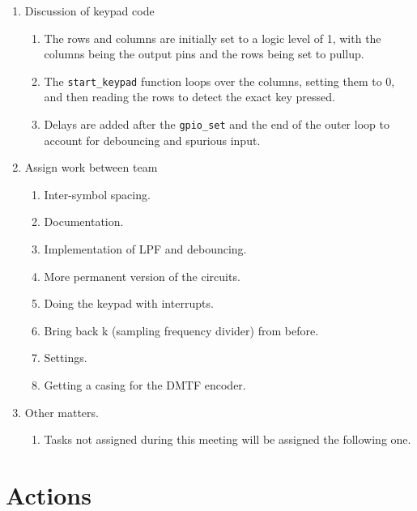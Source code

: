 \documentclass[11pt,a4paper]{scrartcl}
\begin{document}
\begin{enumerate}
\item Discussion of keypad code
\begin{enumerate}
    \item The rows and columns are initially set to a logic level of 1, with the columns being the output pins and the rows being set to pullup.
    \item The \verb!start_keypad! function loops over the columns, setting them to 0, and then reading the rows to detect the exact key pressed.
    \item Delays are added after the \verb!gpio_set! and the end of the outer loop to account for debouncing and spurious input.
\end{enumerate}

\item Assign work between team
\begin{enumerate}
    \item Inter-symbol spacing.
    \item Documentation.
    \item Implementation of LPF and debouncing.
    \item More permanent version of the circuits.
    \item Doing the keypad with interrupts.
    \item Bring back k (sampling frequency divider) from before.
    \item Settings.
    \item Getting a casing for the DMTF encoder.
\end{enumerate}

\item Other matters.
\begin{enumerate}
    \item Tasks not assigned during this meeting will be assigned the following one.
\end{enumerate}

\end{enumerate}

\section*{Actions}
\end{document}
